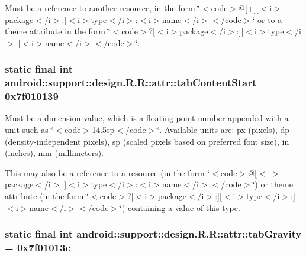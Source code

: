 Must be a reference to another resource, in the form \char`\"{}$<$code$>$@\mbox{[}+\mbox{]}\mbox{[}$<$i$>$package$<$/i$>$:\mbox{]}$<$i$>$type$<$/i$>$:$<$i$>$name$<$/i$>$$<$/code$>$\char`\"{} or to a theme attribute in the form \char`\"{}$<$code$>$?\mbox{[}$<$i$>$package$<$/i$>$:\mbox{]}\mbox{[}$<$i$>$type$<$/i$>$:\mbox{]}$<$i$>$name$<$/i$>$$<$/code$>$\char`\"{}. \hypertarget{classandroid_1_1support_1_1design_1_1_r_1_1attr_888d3afe2e04996a65d3054b2966e449}{
\subsubsection[{tabContentStart}]{\setlength{\rightskip}{0pt plus 5cm}static final int android::support::design.R.R::attr::tabContentStart = 0x7f010139}}
\label{classandroid_1_1support_1_1design_1_1_r_1_1attr_888d3afe2e04996a65d3054b2966e449}


Must be a dimension value, which is a floating point number appended with a unit such as \char`\"{}$<$code$>$14.5sp$<$/code$>$\char`\"{}. Available units are: px (pixels), dp (density-independent pixels), sp (scaled pixels based on preferred font size), in (inches), mm (millimeters). 

This may also be a reference to a resource (in the form \char`\"{}$<$code$>$@\mbox{[}$<$i$>$package$<$/i$>$:\mbox{]}$<$i$>$type$<$/i$>$:$<$i$>$name$<$/i$>$$<$/code$>$\char`\"{}) or theme attribute (in the form \char`\"{}$<$code$>$?\mbox{[}$<$i$>$package$<$/i$>$:\mbox{]}\mbox{[}$<$i$>$type$<$/i$>$:\mbox{]}$<$i$>$name$<$/i$>$$<$/code$>$\char`\"{}) containing a value of this type. \hypertarget{classandroid_1_1support_1_1design_1_1_r_1_1attr_01f14a55e842e59ad015390e7a5b4508}{
\subsubsection[{tabGravity}]{\setlength{\rightskip}{0pt plus 5cm}static final int android::support::design.R.R::attr::tabGravity = 0x7f01013c}}
\label{classandroid_1_1support_1_1design_1_1_r_1_1attr_01f14a55e842e59ad015390e7a5b4508}


